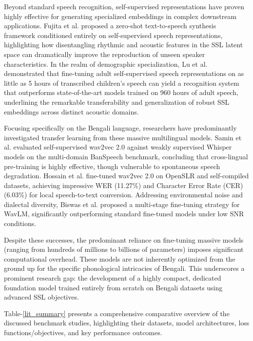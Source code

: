 Beyond standard speech recognition, self-supervised representations have proven highly effective for generating specialized embeddings in complex downstream applications. Fujita et al. \cite{fujita2023zero} proposed a zero-shot text-to-speech synthesis framework conditioned entirely on self-supervised speech representations, highlighting how disentangling rhythmic and acoustic features in the SSL latent space can dramatically improve the reproduction of unseen speaker characteristics. In the realm of demographic specialization, Lu et al. \cite{lu2022improving} demonstrated that fine-tuning adult self-supervised speech representations on as little as 5 hours of transcribed children’s speech can yield a recognition system that outperforms state-of-the-art models trained on 960 hours of adult speech, underlining the remarkable transferability and generalization of robust SSL embeddings across distinct acoustic domains.

Focusing specifically on the Bengali language, researchers have predominantly investigated transfer learning from these massive multilingual models. Samin et al. \cite{samin2024banspeech} evaluated self-supervised wav2vec 2.0 against weakly supervised Whisper models on the multi-domain BanSpeech benchmark, concluding that cross-lingual pre-training is highly effective, though vulnerable to spontaneous speech degradation. Hossain et al. \cite{hossain2024enhancing} fine-tuned wav2vec 2.0 on OpenSLR and self-compiled datasets, achieving impressive WER (11.27\%) and Character Error Rate (CER) (6.03\%) for local speech-to-text conversion. Addressing environmental noise and dialectal diversity, Biswas et al. \cite{biswas2025unified} proposed a multi-stage fine-tuning strategy for WavLM, significantly outperforming standard fine-tuned models under low SNR conditions.

Despite these successes, the predominant reliance on fine-tuning massive models (ranging from hundreds of millions to billions of parameters) imposes significant computational overhead. These models are not inherently optimized from the ground up for the specific phonological intricacies of Bengali. This underscores a prominent research gap: the development of a highly compact, dedicated foundation model trained entirely from scratch on Bengali datasets using advanced SSL objectives. 

Table-\ref{lit_summary} presents a comprehensive comparative overview of the discussed benchmark studies, highlighting their datasets, model architectures, loss functions/objectives, and key performance outcomes.

